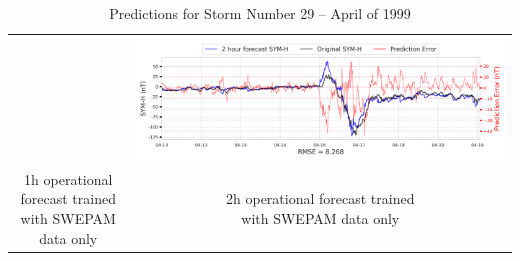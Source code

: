 \documentclass[draft,sw]{agutexSI2019}
\begin{document}
\begin{table}
\begin{tabular}{cc}
&
\includegraphics[width=0.49\linewidth]{paper_plots_shade/2h_swepam_rt/2h_swepam_rt_storm_29.png}
\\
\shortstack{1h operational forecast trained\\ with SWEPAM data only} & \shortstack{2h operational forecast trained\\ with SWEPAM data only}
\vspace*{12pt}
\\
\end{tabular}
\caption{Predictions for Storm Number 29 -- April of 1999}
\label{storm-29}
\end{table}
\end{document}
